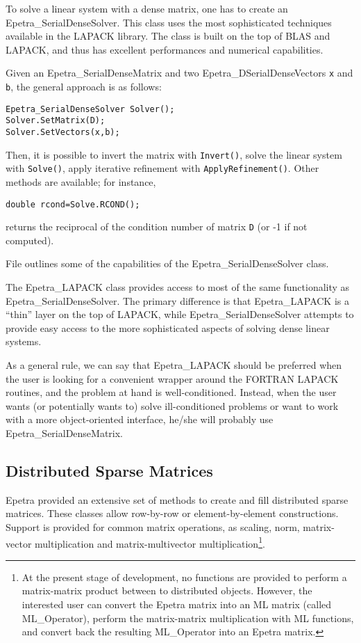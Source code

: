 \smallskip

To solve a linear system with a dense matrix, one has to create an
Epetra\_SerialDenseSolver. This class uses the most sophisticated
techniques available in the LAPACK library. The class is
built on the top of BLAS and LAPACK, and thus has excellent performances
and numerical capabilities.

Given an Epetra\_SerialDenseMatrix and two Epetra\_DSerialDenseVectors
{\tt x} and {\tt b}, the general approach is as follows:
\begin{verbatim}
Epetra_SerialDenseSolver Solver();
Solver.SetMatrix(D);
Solver.SetVectors(x,b);
\end{verbatim}
Then, it is possible to invert the matrix with \verb!Invert()!, solve
the linear system with \verb!Solve()!, apply iterative refinement with
\verb!ApplyRefinement()!. Other methods are available; for instance,
\begin{verbatim}
double rcond=Solve.RCOND();
\end{verbatim}
returns the reciprocal of the condition number of matrix {\tt D} (or -1
if not computed).

File  outlines some of the capabilities of the
Epetra\_SerialDenseSolver class.

\smallskip

The Epetra\_LAPACK class provides access to most of the same
functionality as Epetra\_SerialDenseSolver. The primary difference is
that Epetra\_LAPACK is a ``thin'' layer on the top of LAPACK, while
Epetra\_SerialDenseSolver attempts to provide easy access to the more
sophisticated aspects of solving dense linear systems.

As a general rule, we can say that Epetra\_LAPACK should be preferred
when the user is looking for a convenient wrapper around the FORTRAN
LAPACK routines, and the problem at hand is well-conditioned. Instead,
when the user wants (or potentially wants to) solve ill-conditioned
problems or want to work with a more object-oriented interface, he/she
will probably use Epetra\_SerialDenseMatrix.


\subsection{Distributed Sparse Matrices}
\label{sec:sparse_mat}

Epetra provided an extensive set of methods to create and fill
distributed sparse matrices. These classes allow row-by-row or
element-by-element constructions. Support is provided for common matrix
operations, as scaling, norm, matrix-vector multiplication and
matrix-multivector multiplication\footnote{At the present stage of
  development, no functions are provided to perform a matrix-matrix
  product between to distributed objects. However, the interested user
  can convert the Epetra matrix into an ML matrix (called ML\_Operator),
  perform the matrix-matrix multiplication with ML functions, and
  convert back the resulting ML\_Operator into an Epetra matrix.}.

